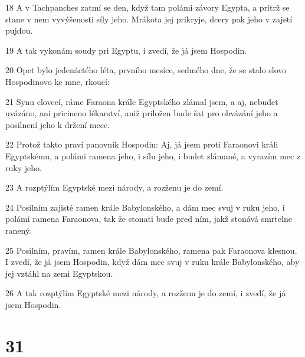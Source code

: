 \par 18 A v Tachpanches zatmí se den, když tam polámi závory Egypta, a prítrž se stane v nem vyvýšenosti síly jeho. Mrákota jej prikryje, dcery pak jeho v zajetí pujdou.
\par 19 A tak vykonám soudy pri Egyptu, i zvedí, že já jsem Hospodin.
\par 20 Opet bylo jedenáctého léta, prvního mesíce, sedmého dne, že se stalo slovo Hospodinovo ke mne, rkoucí:
\par 21 Synu clovecí, ráme Faraona krále Egyptského zlámal jsem, a aj, nebudet uvázáno, ani pricineno lékarství, aniž priložen bude šat pro obvázání jeho a posilnení jeho k držení mece.
\par 22 Protož takto praví panovník Hospodin: Aj, já jsem proti Faraonovi králi Egyptskému, a polámi ramena jeho, i sílu jeho, i budet zlámané, a vyrazím mec z ruky jeho.
\par 23 A rozptýlím Egyptské mezi národy, a rozženu je do zemí.
\par 24 Posilním zajisté ramen krále Babylonského, a dám mec svuj v ruku jeho, i polámi ramena Faraonova, tak že stonati bude pred ním, jakž stonává smrtelne ranený.
\par 25 Posilním, pravím, ramen krále Babylonského, ramena pak Faraonova klesnou. I zvedí, že já jsem Hospodin, když dám mec svuj v ruku krále Babylonského, aby jej vztáhl na zemi Egyptskou.
\par 26 A tak rozptýlím Egyptské mezi národy, a rozženu je do zemí, i zvedí, že já jsem Hospodin.

\chapter{31}

